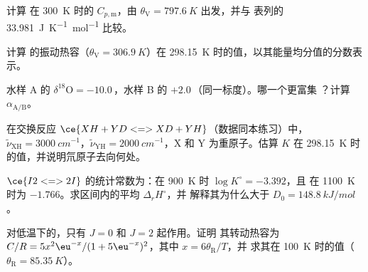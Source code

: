 \begin{exercise}[$\star\star$]\label{exo:b3:statistical-thermo-applied:7}
计算  在 \qty{300}{K} 时的 $C_{p,\mathrm m}$，由 $\theta_{\mathrm V} = \qty{797.6}{K}$ 出发，并与
表列的 \qty{33.981}{J.K^{-1}.mol^{-1}} 比较。
\end{exercise}

\begin{exercise}[$\star\star$]\label{exo:b3:statistical-thermo-applied:8}
计算  的振动热容（$\theta_{\mathrm V} = \qty{306.9}{K}$）在
\qty{298.15}{K} 时的值，以其能量均分值的分数表示。
\end{exercise}

\begin{exercise}[$\star\star$]\label{exo:b3:statistical-thermo-applied:9}
水样 A 的 $\delta^{18}\mathrm O = -10.0$\,\textperthousand，水样 B 的
$+2.0$\,\textperthousand（同一标度）。哪一个更富集 ？计算
 $\alpha_{\mathrm{A/B}}$。
\end{exercise}

\begin{exercise}[$\star\star\star$]\label{exo:b3:statistical-thermo-applied:10}
在交换反应 $\ce{XH + YD <=> XD + YH}$（数据同本练习）中，$\tilde\nu_{\mathrm{XH}} =
\qty{3000}{cm^{-1}}$，$\tilde\nu_{\mathrm{YH}} = \qty{2000}{cm^{-1}}$，X 和 Y 为重原子。估算 $K$ 在
\qty{298.15}{K} 时的值，并说明氘原子去向何处。
\end{exercise}

\begin{exercise}[$\star\star\star$]\label{exo:b3:statistical-thermo-applied:11}
$\ce{I2 <=> 2 I}$ 的统计常数为：在 \qty{900}{K} 时 $\log K^\circ = -3.392$，且
在 \qty{1100}{K} 时为 $-1.766$。求区间内的平均 $\Delta_rH^\circ$，并
解释其为什么大于 $D_0 = \qty{148.8}{kJ/mol}$。
\end{exercise}

\begin{exercise}[$\star\star\star$]\label{exo:b3:statistical-thermo-applied:12}
对低温下的，只有 $J = 0$ 和 $J = 2$ 起作用。证明
其转动热容为 $C/R = 5x^2\eu^{-x}/(1 + 5\eu^{-x})^2$，其中 $x = 6\theta_{\mathrm R}/T$，并
求其在 \qty{100}{K} 时的值（$\theta_{\mathrm R} = \qty{85.35}{K}$）。
\end{exercise}


